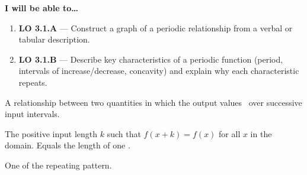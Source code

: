 \documentclass[10pt]{article}
\begin{document}
\namedateperiod

\vspace{0.10in}

\begin{objectivebox}
\textbf{I will be able to\ldots}
\begin{enumerate}[leftmargin=1.5em, itemsep=4pt]
  \item \textbf{LO 3.1.A} --- Construct a graph of a periodic relationship
    from a verbal or tabular description. 
  \item \textbf{LO 3.1.B} --- Describe key characteristics of a periodic
    function (period, intervals of increase/decrease, concavity) and explain
    why each characteristic repeats. 
\end{enumerate}
\end{objectivebox}

\vspace{0.08in}

\begin{vocabbox}
\begin{description}[leftmargin=0pt, itemsep=6pt]
  \item[\termblanklong{periodic relationship}]
    A relationship between two quantities in which the output values
    \ over
    successive  input intervals.

  \item[\termblanklong{period}]
    The  positive input length $k$ such that
    $f(x + k) = f(x)$ for all $x$ in the domain. Equals the length of
    one .

  \item[\termblanklong{cycle}]
    One  of the repeating pattern.
\end{description}
\end{vocabbox}

\vspace{0.08in}
\end{document}
